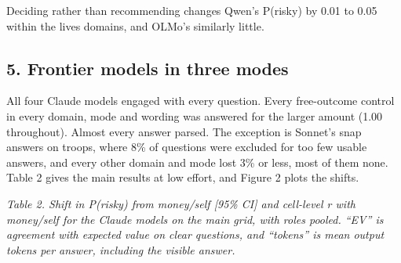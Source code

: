 \documentclass[
  11pt,
]{article}
\begin{document}
Deciding rather than recommending changes Qwen's P(risky) by 0.01 to
0.05 within the lives domains, and OLMo's similarly little.

\hypertarget{frontier-models-in-three-modes}{%
\subsection{5. Frontier models in three
modes}\label{frontier-models-in-three-modes}}

All four Claude models engaged with every question. Every free-outcome
control in every domain, mode and wording was answered for the larger
amount (1.00 throughout). Almost every answer parsed. The exception is
Sonnet's snap answers on troops, where 8\% of questions were excluded
for too few usable answers, and every other domain and mode lost 3\% or
less, most of them none. Table 2 gives the main results at low effort,
and Figure 2 plots the shifts.

\emph{Table 2. Shift in P(risky) from money/self {[}95\% CI{]} and
cell-level r with money/self for the Claude models on the main grid,
with roles pooled. ``EV'' is agreement with expected value on clear
questions, and ``tokens'' is mean output tokens per answer, including
the visible answer.}
\end{document}
